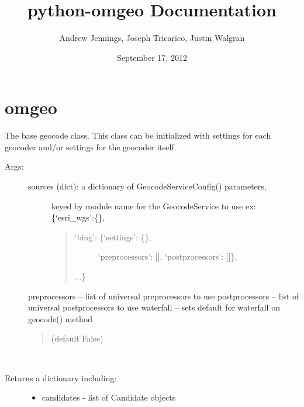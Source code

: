 \documentclass[letterpaper,10pt,english]{sphinxmanual}
\title{python-omgeo Documentation}
\date{September 17, 2012}
\author{Andrew Jennings, Joseph Tricarico, Justin Walgran}
\begin{document}
\maketitle
\tableofcontents
{}\label{index::doc}



\chapter{omgeo}
\label{index:omgeo}\label{index:module-omgeo}\label{index:contents}

\begin{fulllineitems}
\label{index:omgeo.Geocoder}
The base geocode class.  This class can be initialized with settings
for each geocoder and/or settings for the geocoder itself.
\begin{description}
\item[{Args:}] \leavevmode\begin{description}
\item[{sources (dict): a dictionary of GeocodeServiceConfig() parameters,}] \leavevmode
keyed by module name for the GeocodeService to use
ex: \{`esri\_wgs':\{\},
\begin{quote}
\begin{description}
\item[{`bing': \{`settings': \{\},}] \leavevmode
`preprocessors': {[}{]},
`postprocessors': {[}{]}\},

\end{description}

...\}
\end{quote}

\end{description}

preprocessors   -- list of universal preprocessors to use
postprocessors  -- list of universal postprocessors to use
waterfall       -- sets default for waterfall on geocode() method
\begin{quote}

(default False)
\end{quote}

\end{description}

\begin{fulllineitems}
\label{index:omgeo.Geocoder.geocode}~\begin{description}
\item[{Returns a dictionary including:}] \leavevmode\begin{itemize}
\item {} 
candidates - list of Candidate objects


\end{itemize}
\end{description}
\end{fulllineitems}
\end{fulllineitems}
\end{document}
